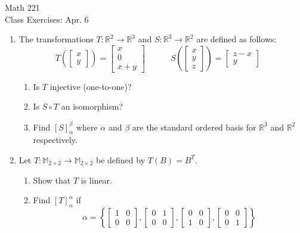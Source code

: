 \documentclass[11pt]{article}
\begin{document}
\begin{center}
	\Large
	\rm{Math 221}
	\\
	\rm{Class Exercises:  Apr. 6}
	\\
\end{center}
\vspace{0.2in}

\begin{enumerate}
\item{
	The transformations $T:\mathbb{R}^2\to\mathbb{R}^3$ and $S:\mathbb{R}^3\to\mathbb{R}^2$ 
	are defined as follows:
	\begin{displaymath}
	T\left(\left[ \begin{array}{r} x \\ y \end{array} \right] \right) =  \left[ \begin{array}{c} x \\ 0 \\ x+y \end{array} \right] \quad \quad \quad 
	S\left(\left[ \begin{array}{r} x \\ y \\ z  \end{array} \right] \right) =  \left[ \begin{array}{c} z-x \\ y \end{array} \right] \quad
	\end{displaymath}
	\begin{enumerate}
		\item {Is $T$ injective (one-to-one)?}
		\item {Is $S\circ T$ an isomorphism?}
		\item {Find $[S]_{\alpha}^{\beta}$ where $\alpha$ and $\beta$ are the standard ordered basis for $\mathbb{R}^3$ and $\mathbb{R}^2$ respectively.}
	\end{enumerate}
}
\item{Let $T:\mathbb{M}_{2\times 2} \to \mathbb{M}_{2\times 2}$ be defined by $T(B)=B^T$.
	\begin{enumerate}
		\item {Show that $T$ is linear.}
		\item {Find $[T]_{\alpha}^{\alpha}$ if
			\begin{displaymath}
			\alpha = \left\{\left[ \begin{array}{rr} 1&0\\0& 0 \end{array} \right],
			\left[ \begin{array}{rr} 0&1\\0& 0 \end{array} \right],
			\left[ \begin{array}{rr} 0&0\\1& 0 \end{array} \right],
			\left[ \begin{array}{rr} 0&0\\0& 1 \end{array} \right] \right\}
			\end{displaymath}
		}
	\end{enumerate}
}


\end{enumerate}
\end{document}
